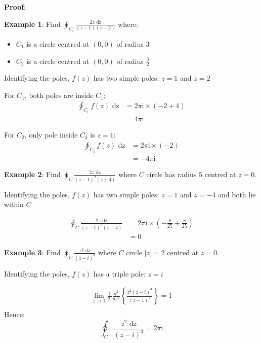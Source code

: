 \documentclass[10pt,a4paper]{article}
\begin{document}
\textbf{Proof}:

\textbf{Example 1}: Find $\oint_{C_i} \frac{2z\text{ dz}}{(z-1)(z-2)}$ where:
\begin{itemize}
    \item $C_1$ is a circle centred at $(0,0)$ of radius 3
    \item $C_2$ is a circle centred at $(0,0)$ of radius $\frac{3}{2}$
\end{itemize}

Identifying the poles, $f(z)$ has two simple poles: $z=1$ and $z=2$ \par 

For $C_1$, both poles are inside $C_1$: 
\begin{equation*} 
    \begin{aligned}
        \oint_{C_1} f(z)\text{ dz} &= 2\pi \text{i} \times (-2 + 4) \\
        &= 4\pi \text{i}
    \end{aligned}
\end{equation*}

For $C_2$, only pole inside $C_2$ is $z=1$:
\begin{equation*} 
    \begin{aligned}
        \oint_{C_1} f(z)\text{ dz} &= 2\pi \text{i} \times (-2) \\
        &= -4\pi \text{i}
    \end{aligned}
\end{equation*}

\textbf{Example 2}: Find $\oint_{C} \frac{2z\text{ dz}}{(z-1)^2(z+4)}$ where $C$ circle has radius 5
centred at $z=0$. \par 

Identifying the poles, $f(z)$ has two simple poles: $z=1$ and $z=-4$ and both lie within $C$\par 
\begin{equation*} 
    \begin{aligned}
        \oint_{C} \frac{2z\text{ dz}}{(z-1)^2(z+4)} &= 2\pi \text{i} \times (-\frac{8}{25}+\frac{8}{25}) \\
        &= 0
    \end{aligned}
\end{equation*}

\textbf{Example 3}: Find $\oint_{C} \frac{z^2\text{ dz}}{(z-i)^3}$ where $C$ circle $|z|=2$
centred at $z=0$. \par 

Identifying the poles, $f(z)$ has a triple pole: $z=i$ \par
\begin{equation*} 
    \begin{aligned}
        \lim_{z\rightarrow 1}\frac{1}{2!}\frac{d^2}{dz^2}\left\{\frac{z^2(z-i)^3}{(z-1)^3}\right\}= 1\\
    \end{aligned}
\end{equation*}
Hence:
$$
\oint_{C} \frac{z^2\text{ dz}}{(z-i)^3} = 2\pi \text{i}
$$
\end{document}
